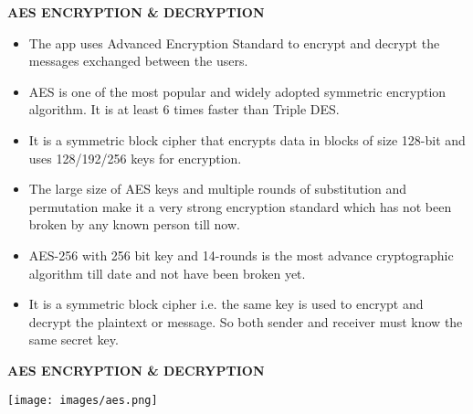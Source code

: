 \documentclass{beamer}
\begin{document}
\begin{frame}
\begin{tcolorbox}
\begin{center}
\textsc{\textbf{\textcolor{byzantium}{AES ENCRYPTION & DECRYPTION}}}
\end{center} 
\end{tcolorbox}
\begin{flushleft}
\begin{itemize}
\item The app uses Advanced Encryption Standard to encrypt and decrypt the messages exchanged between the users.
\item AES is one of the most popular and widely adopted symmetric encryption algorithm. It is at  least 6 times faster than Triple DES.
\item It is a symmetric block cipher that encrypts data in blocks of size 128-bit and uses 128/192/256 keys for encryption.
\item The large size of AES keys and multiple rounds of substitution and permutation make it a very strong encryption standard which has not been broken by any known person till now. 
\item AES-256 with 256 bit key and 14-rounds is the most advance cryptographic algorithm till date and not have been broken yet.
\item It is a symmetric block cipher i.e. the same key is used to encrypt and decrypt the plaintext or message. So both sender and receiver must know the same secret key.
\end{itemize}
\end{flushleft}
\end{frame}

\begin{frame}[plain]
\begin{tcolorbox}
\begin{center}
\textsc{\textbf{\textcolor{byzantium}{AES ENCRYPTION & DECRYPTION}}}
\end{center} 
\end{tcolorbox}
\begin{center}
\texttt{[image: images/aes.png]}
\end{center}
\end{frame}
\end{document}
